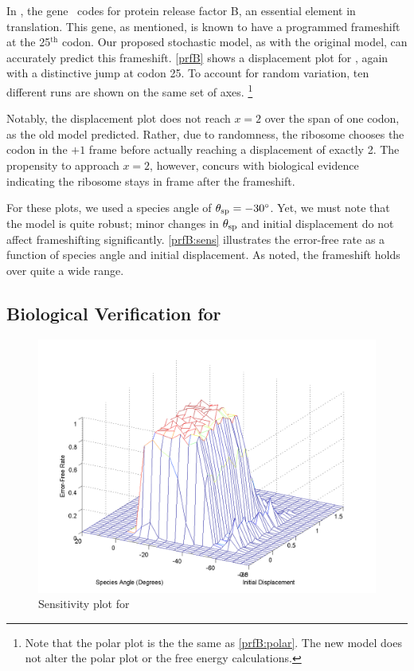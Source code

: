 \documentclass[12pt]{article}
\numberwithin{equation}{section}
\begin{document}
In \ecoli, the gene \prfB\ codes for protein release factor B, an
essential element in translation.  This gene, as mentioned, is known
to have a programmed frameshift at the 25$^{\textrm{th}}$ codon.  Our
proposed stochastic model, as with the original model, can accurately
predict this frameshift.  \autoref{prfB} shows a displacement plot for
\prfB, again with a distinctive jump at codon 25.  To account for
random variation, ten different runs are shown on the same set of
axes.
\footnote{Note that the polar plot is the the same as \autoref{prfB:polar}. 
The new model does not alter the polar plot or the free energy calculations.}

Notably, the displacement plot does not reach $x=2$ over the span of one codon, as the old model predicted.
Rather, due to randomness, the ribosome chooses the codon in the $+1$ frame before actually reaching a displacement of exactly 2.
The propensity to approach $x=2$, however, concurs with biological
evidence indicating the ribosome stays in frame after the frameshift.

For these plots, we used a species angle of $\theta_{\rm{sp}} =-30^\circ$.
Yet, we must note that the model is quite robust; minor changes
in $\theta_{\rm{sp}}$ and initial displacement do not affect frameshifting significantly.
\autoref{prfB:sens} illustrates the error-free rate as
a function of species angle and initial displacement. As noted,
the frameshift holds over quite a wide range.

\subsection{Biological Verification for \prfB}
\begin{figure}
  \centering
  \caption{Sensitivity plot for \prfB}
  \label{prfB:sens}
  \includegraphics[scale=0.4]{prfB/sensitivity}
\end{figure}
\end{document}
